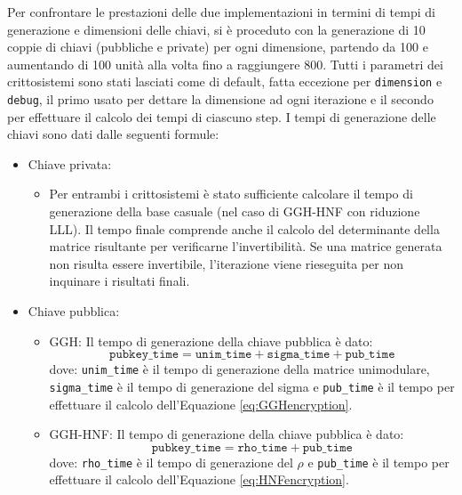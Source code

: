 Per confrontare le prestazioni delle due implementazioni in termini di tempi di generazione 
e dimensioni delle chiavi, si è proceduto con la generazione di 10 coppie di chiavi 
(pubbliche e private) per ogni dimensione, partendo da 100 e aumentando di 100 unità alla volta 
fino a raggiungere 800. Tutti i parametri dei crittosistemi sono stati lasciati come di 
default, fatta eccezione per \texttt{dimension} e \texttt{debug}, il primo usato per 
dettare la dimensione ad ogni iterazione e il secondo per effettuare il calcolo dei tempi
di ciascuno step. I tempi di generazione delle chiavi sono dati dalle seguenti formule:
\begin{itemize}
    \item Chiave privata:
    \begin{itemize}
        \item Per entrambi i crittosistemi è stato sufficiente calcolare il tempo di 
        generazione della base casuale (nel caso di GGH-HNF con riduzione LLL). Il tempo
        finale comprende anche il calcolo del determinante della matrice risultante 
        per verificarne l'invertibilità. Se una matrice generata non risulta essere 
        invertibile, l'iterazione viene rieseguita per non inquinare i risultati finali. 
    \end{itemize}
    \item Chiave pubblica:
    \begin{itemize}
        \item GGH: Il tempo di generazione della chiave pubblica è dato:
        $$\texttt{pubkey\_time} = \texttt{unim\_time}+\texttt{sigma\_time}+\texttt{pub\_time}$$
        dove: \texttt{unim\_time} è il tempo di generazione della matrice unimodulare, 
        \texttt{sigma\_time} è il tempo di generazione del sigma e \texttt{pub\_time} è il 
        tempo per effettuare il calcolo dell'Equazione \ref{eq:GGHencryption}.
        \item GGH-HNF: Il tempo di generazione della chiave pubblica è dato:
        $$\texttt{pubkey\_time} = \texttt{rho\_time}+\texttt{pub\_time}$$
        dove: \texttt{rho\_time} è il tempo di generazione del $\rho$ e 
        \texttt{pub\_time} è il tempo per effettuare il calcolo dell'Equazione \ref{eq:HNFencryption}.
    \end{itemize} 
\end{itemize}

